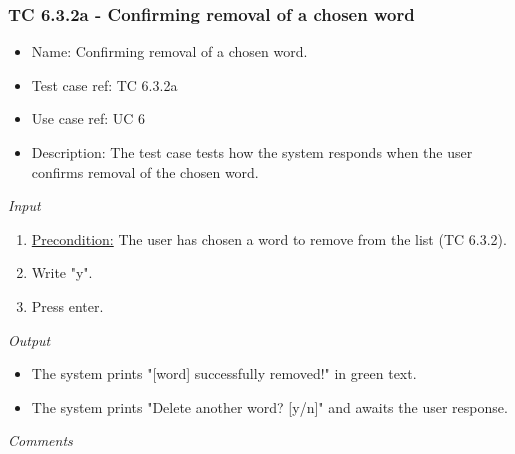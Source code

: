 \documentclass[12pt, letterpaper]{article}
\begin{document}
\subsubsection{TC 6.3.2a - Confirming removal of a chosen word}
\begin{itemize}
	\item Name: Confirming removal of a chosen word.
	\item Test case ref: TC 6.3.2a
	\item Use case ref: UC 6
	\item Description: The test case tests how the system responds when the user confirms removal of the chosen word.
\end{itemize}
\emph{Input}
\begin{enumerate}
	\item \underline{Precondition:} The user has chosen a word to remove from the list (TC 6.3.2).
	\item Write "y".
	\item Press enter.
\end{enumerate}
\emph{Output}
\begin{itemize}
	\item The system prints "[word] successfully removed!" in green text.
	\item The system prints "Delete another word? [y/n]" and awaits the user response.
\end{itemize}
\begin{Form}
	\newline
	\newline
\end{Form}
\newline
\emph{Comments}
\newline
\newline
\newline
\newline
\newline
\newline
\newline
\end{document}
